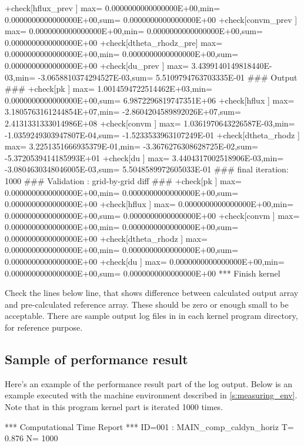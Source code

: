 \begin{LstLog}
 +check[hflux_prev      ] max=  0.0000000000000000E+00,min=  0.0000000000000000E+00,sum=  0.0000000000000000E+00
 +check[convm_prev      ] max=  0.0000000000000000E+00,min=  0.0000000000000000E+00,sum=  0.0000000000000000E+00
 +check[dtheta_rhodz_pre] max=  0.0000000000000000E+00,min=  0.0000000000000000E+00,sum=  0.0000000000000000E+00
 +check[du_prev         ] max=  3.4399140149818440E-03,min= -3.0658810374294527E-03,sum=  5.5109794763703335E-01
 ### Output ###
 +check[pk              ] max=  1.0014594722514462E+03,min=  0.0000000000000000E+00,sum=  6.9872296819747351E+06
 +check[hflux           ] max=  3.1805763161244854E+07,min= -2.8604204589892026E+07,sum=  2.4131331333014986E+08
 +check[convm           ] max=  1.0361970643226587E-03,min= -1.0359249303947807E-04,sum= -1.5233533963107249E-01
 +check[dtheta_rhodz    ] max=  3.2251351666935379E-01,min= -3.3676276308628725E-02,sum= -5.3720539414185993E+01
 +check[du              ] max=  3.4404317002518906E-03,min= -3.0804630348046005E-03,sum=  5.5048589972605033E-01
 ### final iteration:        1000
 ### Validation : grid-by-grid diff ###
 +check[pk              ] max=  0.0000000000000000E+00,min=  0.0000000000000000E+00,sum=  0.0000000000000000E+00
 +check[hflux           ] max=  0.0000000000000000E+00,min=  0.0000000000000000E+00,sum=  0.0000000000000000E+00
 +check[convm           ] max=  0.0000000000000000E+00,min=  0.0000000000000000E+00,sum=  0.0000000000000000E+00
 +check[dtheta_rhodz    ] max=  0.0000000000000000E+00,min=  0.0000000000000000E+00,sum=  0.0000000000000000E+00
 +check[du              ] max=  0.0000000000000000E+00,min=  0.0000000000000000E+00,sum=  0.0000000000000000E+00
 *** Finish kernel
\end{LstLog}

Check the lines below  line,
that shows difference between calculated output array and
pre-calculated reference array.
These should be zero or enough small to be acceptable.
%
There are sample output log files in 
in each kernel program directory, for reference purpose.

\subsection{Sample of performance result}

Here's an example of the performance result part of the log output.
Below is an example executed with the machine environment described in \autoref{s:measuring_env}.
%
Note that in this program kernel part is iterated 1000 times.

\begin{LstLog}
 *** Computational Time Report
 *** ID=001 : MAIN_comp_caldyn_horiz           T=     0.876 N=   1000
\end{LstLog}
